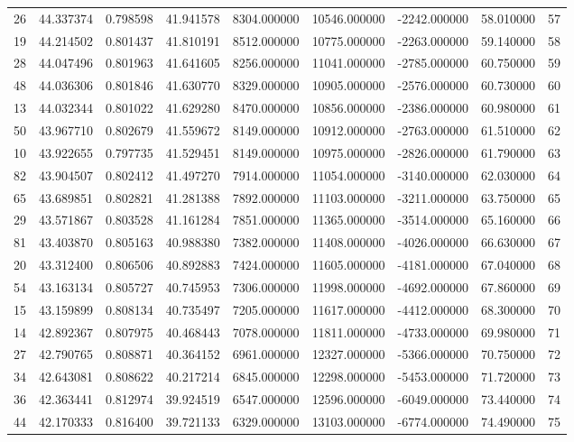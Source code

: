 \begin{tabular}{rrrrrrrrr}
26 & 44.337374 & 0.798598 & 41.941578 & 8304.000000 & 10546.000000 & -2242.000000 & 58.010000 & 57 \\
19 & 44.214502 & 0.801437 & 41.810191 & 8512.000000 & 10775.000000 & -2263.000000 & 59.140000 & 58 \\
28 & 44.047496 & 0.801963 & 41.641605 & 8256.000000 & 11041.000000 & -2785.000000 & 60.750000 & 59 \\
48 & 44.036306 & 0.801846 & 41.630770 & 8329.000000 & 10905.000000 & -2576.000000 & 60.730000 & 60 \\
13 & 44.032344 & 0.801022 & 41.629280 & 8470.000000 & 10856.000000 & -2386.000000 & 60.980000 & 61 \\
50 & 43.967710 & 0.802679 & 41.559672 & 8149.000000 & 10912.000000 & -2763.000000 & 61.510000 & 62 \\
10 & 43.922655 & 0.797735 & 41.529451 & 8149.000000 & 10975.000000 & -2826.000000 & 61.790000 & 63 \\
82 & 43.904507 & 0.802412 & 41.497270 & 7914.000000 & 11054.000000 & -3140.000000 & 62.030000 & 64 \\
65 & 43.689851 & 0.802821 & 41.281388 & 7892.000000 & 11103.000000 & -3211.000000 & 63.750000 & 65 \\
29 & 43.571867 & 0.803528 & 41.161284 & 7851.000000 & 11365.000000 & -3514.000000 & 65.160000 & 66 \\
81 & 43.403870 & 0.805163 & 40.988380 & 7382.000000 & 11408.000000 & -4026.000000 & 66.630000 & 67 \\
20 & 43.312400 & 0.806506 & 40.892883 & 7424.000000 & 11605.000000 & -4181.000000 & 67.040000 & 68 \\
54 & 43.163134 & 0.805727 & 40.745953 & 7306.000000 & 11998.000000 & -4692.000000 & 67.860000 & 69 \\
15 & 43.159899 & 0.808134 & 40.735497 & 7205.000000 & 11617.000000 & -4412.000000 & 68.300000 & 70 \\
14 & 42.892367 & 0.807975 & 40.468443 & 7078.000000 & 11811.000000 & -4733.000000 & 69.980000 & 71 \\
27 & 42.790765 & 0.808871 & 40.364152 & 6961.000000 & 12327.000000 & -5366.000000 & 70.750000 & 72 \\
34 & 42.643081 & 0.808622 & 40.217214 & 6845.000000 & 12298.000000 & -5453.000000 & 71.720000 & 73 \\
36 & 42.363441 & 0.812974 & 39.924519 & 6547.000000 & 12596.000000 & -6049.000000 & 73.440000 & 74 \\
44 & 42.170333 & 0.816400 & 39.721133 & 6329.000000 & 13103.000000 & -6774.000000 & 74.490000 & 75 \\

\end{tabular}
